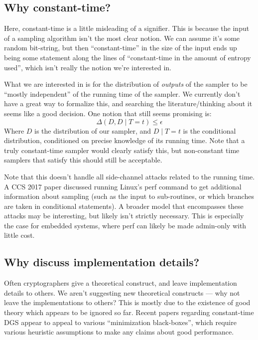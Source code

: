\documentclass{article}
\begin{document}
\subsection{Why constant-time?}
Here, constant-time is a little misleading of a signifier.
This is because the input of a sampling algorithm isn't the most clear notion.
We can assume it's some random bit-string, but then ``constant-time'' in the size of the input ends up being some statement along the lines of ``constant-time in the amount of entropy used'', which isn't really the notion we're interested in.

What we are interested in is for the distribution of \emph{outputs} of the sampler to be ``mostly independent'' of the running time of the sampler.
We currently don't have a great way to formalize this, and searching the literature/thinking about it seems like a good decision.
One notion that still seems promising is:
\begin{equation}
\Delta(D, D\mid T = t) \leq \epsilon
\end{equation}
Where $D$ is the distribution of our sampler, and $D\mid T = t$ is the conditional distribution, conditioned on precise knowledge of its running time.
Note that a truly constant-time sampler would clearly satisfy this, but non-constant time samplers that satisfy this should still be acceptable.

Note that this doesn't handle all side-channel attacks related to the running time.
A CCS 2017 paper discussed running Linux's perf command to get additional information about sampling (such as the input to sub-routines, or which branches are taken in conditional statements).
A broader model that encompasses these attacks may be interesting, but likely isn't strictly necessary.
This is especially the case for embedded systems, where perf can likely be made admin-only with little cost.
\subsection{Why discuss implementation details?}
Often cryptographers give a theoretical construct, and leave implementation details to others.
We aren't suggesting new theoretical constructs --- why not leave the implementations to others?
This is mostly due to the existence of good theory which appears to be ignored so far.
Recent papers regarding constant-time DGS appear to appeal to various ``minimization black-boxes'', which require various heuristic assumptions to make any claims about good performance.
\end{document}
